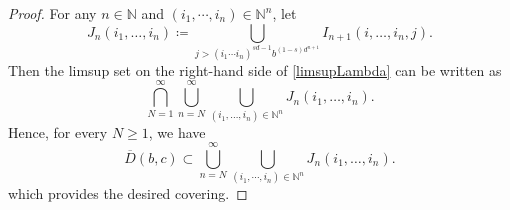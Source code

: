 \documentclass[12pt,reqno]{amsart}
\renewcommand{\=}{\coloneqq}
\theoremstyle{plain}
\begin{document}
\begin{proof}
For any $n \in \mathbb N$ and $(i_1,\cdots,i_{n}) \in \mathbb N^n$, let
 \begin{equation}\label{e.def_J_'}
                J_n(i_1,\dots,i_{n}) \coloneqq
                \bigcup_{j>
                (i_1\cdots i_{n})^{sd-1}
                b^{(1-s)d^{n+1}} }
                I_{n+1}(i,\dots,i_{n},j).
        \end{equation}
Then the limsup set on the right-hand side of \eqref{limsupLambda} can be written as
 \begin{equation*}
                \bigcap_{N=1}^{\infty}
                \bigcup_{n=N}^{\infty}
                \bigcup_{
                        (i_1,\dots, i_{n})
                        \in \mathbb{N}^n
                        }
                         J_n(i_1,\dots,i_{n}).
        \end{equation*}
 Hence, for every $N\geq 1$, we have
 \begin{equation}\label{e.cover_'}
                \overline{D}(b,c)\subset
                \bigcup_{n=N}^{\infty}
                \bigcup_{
                        (i_1,\cdots, i_{n})
                        \in \mathbb{N}^n
                        }
                        J_n(i_1,\dots,i_{n}).
        \end{equation}
which provides the desired covering.


\end{proof}
\end{document}
